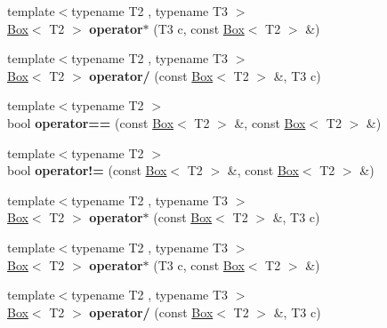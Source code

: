 \begin{DoxyCompactItemize}
\item 
\hypertarget{class_box_acb7a1088a3d15a5d0d515084854da7a6}{
{\footnotesize template$<$typename T2 , typename T3 $>$ }\\\hyperlink{class_box}{Box}$<$ T2 $>$ {\bfseries operator$\ast$} (T3 c, const \hyperlink{class_box}{Box}$<$ T2 $>$ \&)}
\label{class_box_acb7a1088a3d15a5d0d515084854da7a6}

\item 
\hypertarget{class_box_aa7ca8b98d5e0bee623683f0c8a70fda0}{
{\footnotesize template$<$typename T2 , typename T3 $>$ }\\\hyperlink{class_box}{Box}$<$ T2 $>$ {\bfseries operator/} (const \hyperlink{class_box}{Box}$<$ T2 $>$ \&, T3 c)}
\label{class_box_aa7ca8b98d5e0bee623683f0c8a70fda0}

\item 
\hypertarget{class_box_a6039a2c9a493ae6ba38deb18fd9e6ab1}{
{\footnotesize template$<$typename T2 $>$ }\\bool {\bfseries operator==} (const \hyperlink{class_box}{Box}$<$ T2 $>$ \&, const \hyperlink{class_box}{Box}$<$ T2 $>$ \&)}
\label{class_box_a6039a2c9a493ae6ba38deb18fd9e6ab1}

\item 
\hypertarget{class_box_a5036b46321a1cf15710571b4f5e2a6e6}{
{\footnotesize template$<$typename T2 $>$ }\\bool {\bfseries operator!=} (const \hyperlink{class_box}{Box}$<$ T2 $>$ \&, const \hyperlink{class_box}{Box}$<$ T2 $>$ \&)}
\label{class_box_a5036b46321a1cf15710571b4f5e2a6e6}

\item 
\hypertarget{class_box_a9cc1a4474d25a4b472097480732acc93}{
{\footnotesize template$<$typename T2 , typename T3 $>$ }\\\hyperlink{class_box}{Box}$<$ T2 $>$ {\bfseries operator$\ast$} (const \hyperlink{class_box}{Box}$<$ T2 $>$ \&, T3 c)}
\label{class_box_a9cc1a4474d25a4b472097480732acc93}

\item 
\hypertarget{class_box_acb7a1088a3d15a5d0d515084854da7a6}{
{\footnotesize template$<$typename T2 , typename T3 $>$ }\\\hyperlink{class_box}{Box}$<$ T2 $>$ {\bfseries operator$\ast$} (T3 c, const \hyperlink{class_box}{Box}$<$ T2 $>$ \&)}
\label{class_box_acb7a1088a3d15a5d0d515084854da7a6}

\item 
\hypertarget{class_box_aa7ca8b98d5e0bee623683f0c8a70fda0}{
{\footnotesize template$<$typename T2 , typename T3 $>$ }\\\hyperlink{class_box}{Box}$<$ T2 $>$ {\bfseries operator/} (const \hyperlink{class_box}{Box}$<$ T2 $>$ \&, T3 c)}
\label{class_box_aa7ca8b98d5e0bee623683f0c8a70fda0}


\end{DoxyCompactItemize}
